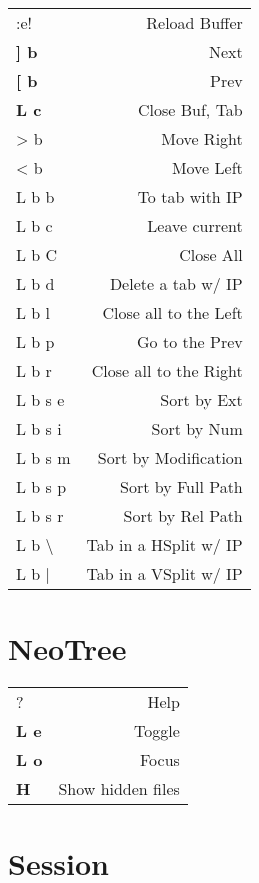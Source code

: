 \documentclass[
  ,landscape
  ,columns=4
]{cheatsheet}
\begin{document}
\begin{tabular}{lr}
	:e!                & Reload Buffer          \\
	\textbf{{]} b}     & Next                   \\
	\textbf{{[} b}     & Prev                   \\
	\textbf{L c}       & Close Buf, Tab         \\
	> b                & Move Right             \\
	< b                & Move Left              \\
	L b b              & To tab with IP         \\
	L b c              & Leave current          \\
	L b C              & Close All              \\
	L b d              & Delete a tab w/ IP     \\
	L b l              & Close all to the Left  \\
	L b p              & Go to the Prev         \\
	L b r              & Close all to the Right \\
	L b s e            & Sort by Ext            \\
	L b s i            & Sort by Num            \\
	L b s m            & Sort by Modification   \\
	L b s p            & Sort by Full Path      \\
	L b s r            & Sort by Rel Path       \\
	L b \textbackslash & Tab in a HSplit w/ IP  \\
	L b {|}            & Tab in a VSplit w/ IP  \\
\end{tabular}

\section{NeoTree}

\begin{tabular}{lr}
	?            & Help              \\
	\textbf{L e} & Toggle            \\
	\textbf{L o} & Focus             \\
	\textbf{H}   & Show hidden files \\
\end{tabular}

\section{Session}
\end{document}

